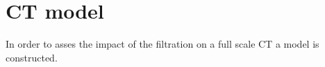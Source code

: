 \section{CT model}
In order to asses the impact of the filtration on a full scale CT a model is constructed.
